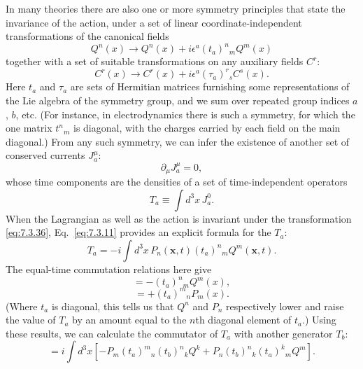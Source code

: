 In many theories there are also one or more symmetry principles that state the
invariance of the action, under a set of linear coordinate-independent
transformations of the canonical fields
\begin{equation}
Q^n(x)\longrightarrow Q^n(x)+i\epsilon^a(t_a)^n{}_mQ^m(x)
\tag{7.3.36}\label{eq:7.3.36}
\end{equation}
together with a set of suitable transformations on any auxiliary fields $C^r$:
\begin{equation}
C^r(x)\longrightarrow C^r(x)+i\epsilon^a(\tau_a)^r{}_sC^s(x).
\tag{7.3.37}\label{eq:7.3.37}
\end{equation}
Here $t_a$ and $\tau_a$ are sets of Hermitian matrices furnishing some
representations of the Lie algebra of the symmetry group, and we sum over
repeated group indices $a$, $b$, etc. (For instance, in electrodynamics there
is such a symmetry, for which the one matrix $t^n{}_m$ is diagonal, with the
charges carried by each field on the main diagonal.) From any such symmetry,
we can infer the existence of another set of conserved currents $J_a^\mu$:
\begin{equation}
\partial_\mu J_a^\mu=0,
\tag{7.3.38}\label{eq:7.3.38}
\end{equation}
whose time components are the densities of a set of time-independent operators
\begin{equation}
T_a\equiv\int d^3x\,J_a^0.
\tag{7.3.39}\label{eq:7.3.39}
\end{equation}
When the Lagrangian as well as the action is invariant under the transformation
\eqref{eq:7.3.36}, Eq.~\eqref{eq:7.3.11} provides an explicit formula for the $T_a$:
\begin{equation}
T_a=-i\int d^3x\,P_n(\mathbf{x},t)(t_a)^n{}_mQ^m(\mathbf{x},t).
\tag{7.3.40}\label{eq:7.3.40}
\end{equation}
The equal-time commutation relations here give
\begin{equation}
[T_a,Q^n(x)]=-(t_a)^n{}_mQ^m(x),
\tag{7.3.41}\label{eq:7.3.41}
\end{equation}
\begin{equation}
[T_a,P_n(x)]=+(t_a)^m{}_nP_m(x).
\tag{7.3.42}\label{eq:7.3.42}
\end{equation}
(Where $t_a$ is diagonal, this tells us that $Q^n$ and $P_n$ respectively
lower and raise the value of $T_a$ by an amount equal to the $n$th diagonal
element of $t_a$.) Using these results, we can calculate the commutator of
$T_a$ with another generator $T_b$:
\begin{equation}
[T_a,T_b] =i\int d^3x\left[
-P_m(t_a)^m{}_n(t_b)^n{}_kQ^k
+P_n(t_b)^n{}_k(t_a)^k{}_mQ^m\right].
\tag{7.3.43}\label{eq:7.3.43}
\end{equation}
